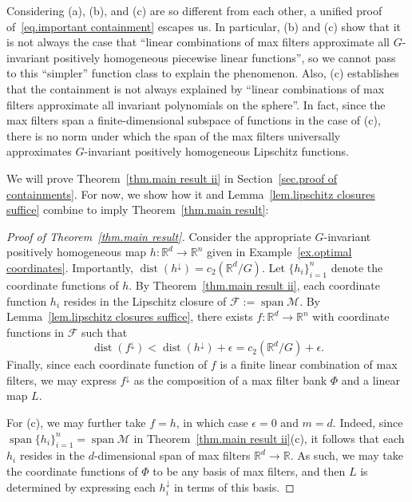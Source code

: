 \documentclass{article}
\theoremstyle{plain}
\theoremstyle{definition}
\begin{document}
Considering (a), (b), and (c) are so different from each other, a unified proof of~\eqref{eq.important containment} escapes us.
In particular, (b) and (c) show that it is not always the case that ``linear combinations of max filters approximate all $G$-invariant positively homogeneous piecewise linear functions'', so we cannot pass to this ``simpler'' function class to explain the phenomenon.
Also, (c) establishes that the containment is not always explained by ``linear combinations of max filters approximate all invariant polynomials on the sphere''.
In fact, since the max filters span a finite-dimensional subspace of functions in the case of (c), there is no norm under which the span of the max filters universally approximates $G$-invariant positively homogeneous Lipschitz functions.

We will prove Theorem~\ref{thm.main result ii} in Section~\ref{sec.proof of containments}.
For now, we show how it and Lemma~\ref{lem.lipschitz closures suffice} combine to imply Theorem~\ref{thm.main result}:

\begin{proof}[Proof of Theorem~\ref{thm.main result}]
Consider the appropriate $G$-invariant positively homogeneous map $h\colon\mathbb{R}^d\to\mathbb{R}^n$ given in Example~\ref{ex.optimal coordinates}.
Importantly, $\operatorname{dist}(h^\downarrow)=c_2(\mathbb{R}^d/G)$.
Let $\{h_i\}_{i=1}^n$ denote the coordinate functions of $h$.
By Theorem~\ref{thm.main result ii}, each coordinate function $h_i$ resides in the Lipschitz closure of $\mathcal{F}:=\operatorname{span}\mathcal{M}$.
By Lemma~\ref{lem.lipschitz closures suffice}, there exists $f\colon\mathbb{R}^d\to\mathbb{R}^n$ with coordinate functions in $\mathcal{F}$ such that 
\[
\operatorname{dist}(f^\downarrow)<\operatorname{dist}(h^\downarrow)+\epsilon=c_2(\mathbb{R}^d/G)+\epsilon.
\]
Finally, since each coordinate function of $f$ is a finite linear combination of max filters, we may express $f^\downarrow$ as the composition of a max filter bank $\Phi$ and a linear map $L$.

For (c), we may further take $f=h$, in which case $\epsilon=0$ and $m=d$.
Indeed, since $\operatorname{span}\{h_i\}_{i=1}^n=\operatorname{span}\mathcal{M}$ in Theorem~\ref{thm.main result ii}(c), 
it follows that each $h_i$ resides in the $d$-dimensional span of max filters $\mathbb{R}^d\to\mathbb{R}$.
As such, we may take the coordinate functions of $\Phi$ to be any basis of max filters, and then $L$ is determined by expressing each $h_i^\downarrow$ in terms of this basis.
\end{proof}
\end{document}
